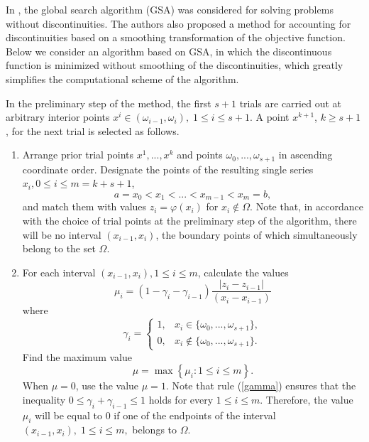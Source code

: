 \documentclass[runningheads]{llncs}
\begin{document}
In \cite{Strongin2000}, the global search algorithm (GSA) was considered for solving problems without discontinuities. The authors also proposed a method for accounting for discontinuities based on a smoothing transformation of the objective function. Below we consider an algorithm based on GSA, in which the discontinuous function is minimized without smoothing of the discontinuities, which greatly simplifies the computational scheme of the algorithm.

In the preliminary step of the method, the first $s+1$ trials are carried out at arbitrary interior points $x^i \in (\omega_{i-1},\omega_{i}), \; 1 \leq i \leq s+1 $. A point $x^{k+1}$, $k \geq s+1$, for the next trial is selected as follows.

\begin{enumerate}
\item Arrange prior trial points $x^1,...,x^k$ and points $\omega_{0}, ..., \omega_{s+1}$ in ascending coordinate order. Designate the points of the resulting single series $x_i, 0\leq i \leq m = k + s + 1$,
\begin{equation}\label{pointsX}
a = x_0 < x_1 < ... < x_{m-1} < x_{m} = b,
\end{equation}
and match them with values $z_i=\varphi(x_i)$ for $x_i \not\in \Omega$. Note that, in accordance with the choice of trial points at the preliminary step of the algorithm, there will be no interval $(x_{i-1},x_i)$, the boundary points of which simultaneously belong to the set $\Omega$.

\item For each interval $(x_{i-1},x_i ), 1\leq i \leq m$, calculate the values
\begin{equation}\label{mu_i}
\mu_i=(1-\gamma_i-\gamma_{i-1} )  \frac{|z_i-z_{i-1} |}{(x_i-x_{i-1} )}
\end{equation}
where
\begin{equation}\label{gamma}
\gamma_i = 
\begin{cases}
	1, &\text{$x_i \in \{\omega_{0},...,\omega_{s+1}\} $}, \\
	0, &\text{$x_i \not\in \{\omega_{0},...,\omega_{s+1}\}. $}
\end{cases}
\end{equation}
Find the maximum value 
\[
\mu=\max\left\{\mu_i: 1 \leq i \leq m\right\}.
\]
When $\mu=0$, use the value $\mu=1$.
Note that rule (\ref{gamma}) ensures that the inequality $0 \leq \gamma_i+\gamma_{i-1} \leq 1$ holds for every $1 \leq i \leq m$. Therefore, the value $\mu_i$ will be equal to 0 if one of the endpoints of the interval $ (x_{i-1},x_i ), \; 1 \leq i \leq m,$ belongs to $\Omega$.


\end{enumerate}
\end{document}

